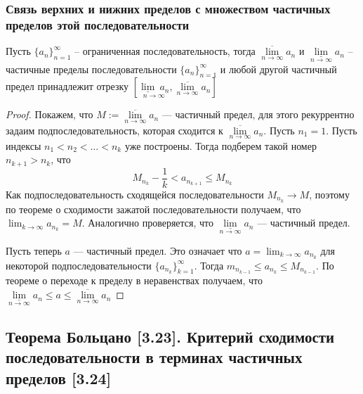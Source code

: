 \documentclass[12pt, a4paper]{article}
\begin{document}
    \subsubsection{Связь верхних и нижних пределов с множеством частичных пределов этой последовательности}
    Пусть $\{a_n\}^{\infty}_{n = 1}$ -- ограниченная последовательность, тогда $\underset{n \to \infty}{\overline{\lim}} a_n$ и $\underset{n \to \infty}{\underline{\lim}} a_n$ -- частичные пределы последовательности $\{a_n\}^{\infty}_{n=1}$ и любой другой частичный предел принадлежит отрезку $\left[\underset{n \to \infty}{\underline{\lim}\ a_n}, \underset{n \to \infty}{\overline{\lim}} a_n\right]$
    \begin{proof}
    Покажем, что $M := \underset{n \to \infty}{\overline{\lim}} a_n$ --- частичный предел, для этого рекуррентно задаим подпоследовательность, которая сходится к $\underset{n \to \infty}{\overline{\lim}} a_n$. Пусть $n_1 = 1$. Пусть индексы $n_1 < n_2 < \dots < n_k$ уже построены. Тогда подберем такой номер $n_{k + 1} > n_k$, что 
    \begin{equation*}
        M_{n_k} - \frac{1}{k} < a_{n_{k+1}} \leq M_{n_k}
    \end{equation*}
    Как подпоследовательность сходящейся последовательности $M_{n_k} \to M$, поэтому по теореме о сходимости зажатой последовательности получаем, что $\lim_{k \to \infty} a_{n_k} = M$. Аналогично проверяется, что $\underset{n \to \infty}{\underline{\lim}} a_n$ --- частичный предел.

    Пусть теперь $a$ --- частичный предел. Это означает что $a = \lim_{k \to \infty} a_{n_k}$ для некоторой подпоследовательности $\{a_{n_k}\}^{\infty}_{k=1}$. Тогда $m_{n_{k-1}} \leq a_{n_k} \leq M_{n_{k-1}}$. По теореме о переходе к пределу в неравенствах получаем, что $\underset{n \to \infty}{\underline{\lim}} a_n \leq a \leq \underset{n \to \infty}{\overline{\lim}} a_n$ 
    \end{proof}
    \subsection{Теорема Больцано [3.23]. Критерий сходимости последовательности в терминах частичных пределов [3.24]}
\end{document}
